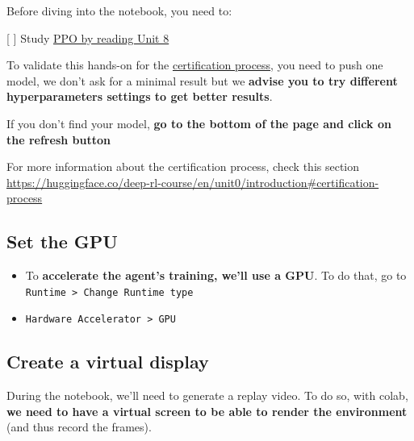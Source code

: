 \documentclass[11pt,a4paper]{article}
\begin{document}
Before diving into the notebook, you need to:

{[} {]} Study \href{https://huggingface.co/deep-rl-course/unit8/introduction}{PPO by reading Unit 8}

To validate this hands-on for the \href{https://huggingface.co/deep-rl-course/en/unit0/introduction\#certification-process}{certification process}, you need to push one model, we don't ask for a minimal result but we \textbf{advise you to try different hyperparameters settings to get better results}.

If you don't find your model, \textbf{go to the bottom of the page and click on the refresh button}

For more information about the certification process, check this section \url{https://huggingface.co/deep-rl-course/en/unit0/introduction#certification-process}

\subsection{Set the GPU}\label{set-the-gpu}

\begin{itemize}
\tightlist
\item
  To \textbf{accelerate the agent's training, we'll use a GPU}. To do that, go to \texttt{Runtime\ \textgreater{}\ Change\ Runtime\ type}
\end{itemize}


\begin{itemize}
\tightlist
\item
  \texttt{Hardware\ Accelerator\ \textgreater{}\ GPU}
\end{itemize}


\subsection{Create a virtual display}\label{create-a-virtual-display}

During the notebook, we'll need to generate a replay video. To do so, with colab, \textbf{we need to have a virtual screen to be able to render the environment} (and thus record the frames).
\end{document}
